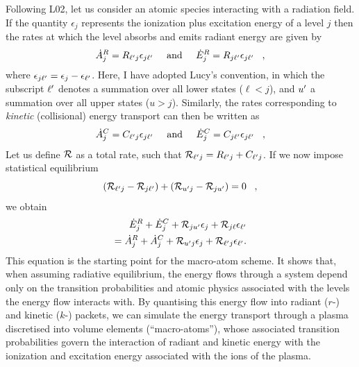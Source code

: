 Following L02, let us consider an atomic species interacting with a radiation field.
If the quantity $\epsilon_j$ represents the ionization plus excitation energy of 
a level $j$ then the rates at which the level absorbs and emits radiant energy 
are given by
\begin{equation}
 \dot{A}_{j}^{R} = R_{{\ell^\prime} j} \epsilon_{j {\ell^\prime}} \;\;\;\;\; {\rm and} \;\;\;
\;\;  \dot{E}_{j}^{R} = R_{j {\ell^\prime}} \epsilon_{j {\ell^\prime}} \;\;\; ,
\end{equation}
where $\epsilon_{j {\ell^\prime}} = \epsilon_j - \epsilon_{\ell^\prime}$.
Here, I have adopted Lucy's convention, in which the subscript 
${\ell^\prime}$ denotes a summation over all lower states ($\ell<j$), and
${u^\prime}$ a summation over all upper states ($u>j$).
Similarly, the rates corresponding to {\em kinetic} (collisional)
energy transport can then be written as
\begin{equation}
 \dot{A}_{j}^{C} = C_{{\ell^\prime} j} \epsilon_{j {\ell^\prime}} \;\;\;\;\; {\rm and}
\;\;\;
\;\;  \dot{E}_{j}^{C} = C_{j {\ell^\prime}} \epsilon_{j {\ell^\prime}} \;\;\; ,
\end{equation}
Let us define ${\cal R}$ as a total rate, such that
${\cal R}_{{\ell^\prime} j}  = R_{{\ell^\prime} j} + C_{{\ell^\prime} j}$.
If we now impose statistical equilibrium
%
\begin{equation}
 ({\cal R}_{{\ell^\prime} j}-{\cal R}_{j {\ell^\prime}})+({\cal R}_{{u^\prime} j}-{\cal R}_{j{u^\prime}})=0 \;\;\;,
\end{equation}
we obtain 
\begin{eqnarray}
 \dot{E}_{j}^{R}+\dot{E}_{j}^{C}+{\cal R}_{j{u^\prime}}\epsilon_{j}+
 {\cal R}_{j \ell}\epsilon_{{\ell^\prime}}  \nonumber \\  
 = \dot{A}_{j}^{R}+\dot{A}_{j}^{C}+{\cal R}_{{u^\prime} j} \epsilon_{j}
 +{\cal R}_{{\ell^\prime} j} \epsilon_{{\ell^\prime}}           .  
 \label{eq:matom_SE}     
\end{eqnarray}
This equation is the starting point for the macro-atom scheme. It shows 
that, when assuming radiative equilibrium, the energy flows through
a system depend only on the transition probabilities and atomic physics
associated with the levels the energy flow interacts with.
By quantising this energy flow into radiant ($r$-) and kinetic ($k$-) packets, 
we can simulate the energy transport through
a plasma discretised into volume elements (``macro-atoms''),
whose associated transition probabilities govern the interaction 
of radiant and kinetic energy with the ionization and excitation energy associated 
with the ions of the plasma.

